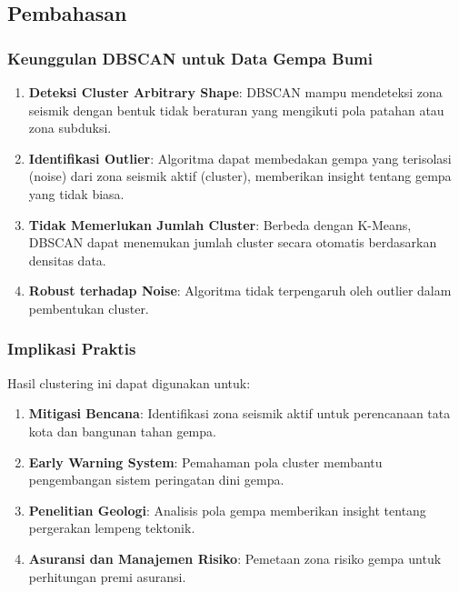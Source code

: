 \documentclass[12pt,a4paper]{article}
\begin{document}
\subsection{Pembahasan}

\subsubsection{Keunggulan DBSCAN untuk Data Gempa Bumi}
\begin{enumerate}
    \item \textbf{Deteksi Cluster Arbitrary Shape}: DBSCAN mampu mendeteksi zona seismik dengan bentuk tidak beraturan yang mengikuti pola patahan atau zona subduksi.
    
    \item \textbf{Identifikasi Outlier}: Algoritma dapat membedakan gempa yang terisolasi (noise) dari zona seismik aktif (cluster), memberikan insight tentang gempa yang tidak biasa.
    
    \item \textbf{Tidak Memerlukan Jumlah Cluster}: Berbeda dengan K-Means, DBSCAN dapat menemukan jumlah cluster secara otomatis berdasarkan densitas data.
    
    \item \textbf{Robust terhadap Noise}: Algoritma tidak terpengaruh oleh outlier dalam pembentukan cluster.
\end{enumerate}

\subsubsection{Implikasi Praktis}
Hasil clustering ini dapat digunakan untuk:
\begin{enumerate}
    \item \textbf{Mitigasi Bencana}: Identifikasi zona seismik aktif untuk perencanaan tata kota dan bangunan tahan gempa.
    
    \item \textbf{Early Warning System}: Pemahaman pola cluster membantu pengembangan sistem peringatan dini gempa.
    
    \item \textbf{Penelitian Geologi}: Analisis pola gempa memberikan insight tentang pergerakan lempeng tektonik.
    
    \item \textbf{Asuransi dan Manajemen Risiko}: Pemetaan zona risiko gempa untuk perhitungan premi asuransi.
\end{enumerate}
\end{document}

